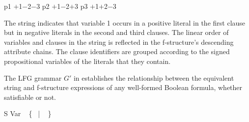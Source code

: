 \documentclass[output=paper,hidelinks]{langscibook}
\begin{document}
\ea\label{genericprob}
\ea p1 $+$1$-$2$-$3  \hsp{.5em} p2 $+$1$-$2$+$3  \hsp{.5em}  p3 $+$1$+$2$-$3
\vspace{2ex}
\ex {}      
\z\z

 \noindent The string indicates that variable 1 occurs in a positive literal in the first clause but in negative literals in the second and third clauses. The linear order of variables and clauses in the string is reflected in the f-structure's descending attribute chains. The clause identifiers are grouped according to the signed propositional variables of the literals that they contain. 
 
 The LFG grammar $G'$ in  establishes the relationship between the equivalent string and  f-structure expressions of any well-formed Boolean formula, whether satisfiable or not.
 
\ea\label{probgram}\small 

\ea\label{genstart}    S \rarrow \hsp{-.5em}
    \hsp{.3em}
\ex\label{genvar}    Var \rarrow \  \hsp{-1.2em}  \hsp{-1.5em}
                                                         \{\ \rcat{$+$}\hsp{-.75em} 
                                                              \hsp{-1em} | \ 
                                                              \rcat{$-$}\hsp{-.75em}\hsp{-1em}
                                                          \}{\Large\kplus}                                   
\z\z
\end{document}
